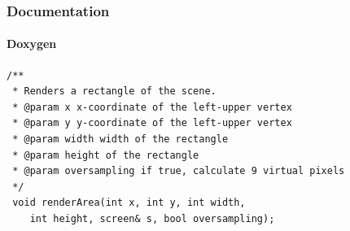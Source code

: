 \begin{frame}
\end{frame}

\begin{frame}[fragile]
\frametitle{Documentation}
\framesubtitle{Doxygen}
\begin{verbatim}
/**
 * Renders a rectangle of the scene.
 * @param x x-coordinate of the left-upper vertex
 * @param y y-coordinate of the left-upper vertex
 * @param width width of the rectangle
 * @param height of the rectangle
 * @param oversampling if true, calculate 9 virtual pixels
 */
 void renderArea(int x, int y, int width, 
 	int height, screen& s, bool oversampling);
\end{verbatim}

\end{frame}

